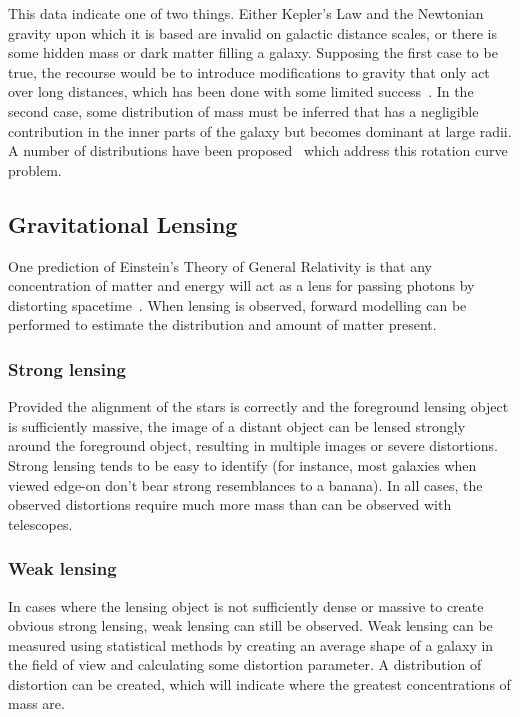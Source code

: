 This data indicate one of two things. Either Kepler's Law and the Newtonian gravity upon which it is based are invalid on galactic distance scales, or there is some hidden mass or dark matter filling a galaxy. Supposing the first case to be true, the recourse would be to introduce modifications to gravity that only act over long distances, which has been done with some limited success~\cite{Milgrom:1983,Moffat:2005si,Worsley:2014}. In the second case, some distribution of mass must be inferred that has a negligible contribution in the inner parts of the galaxy but becomes dominant at large radii. A number of distributions have been proposed~\cite{NGW:1997,Merritt:2006} which address this rotation curve problem.

\subsection{Gravitational Lensing}

One prediction of Einstein's Theory of General Relativity is that any concentration of matter and energy will act as a lens for passing photons by distorting spacetime~\cite{}. When lensing is observed, forward modelling can be performed to estimate the distribution and amount of matter present.

\subsubsection{Strong lensing}

Provided the alignment of the stars is correctly and the foreground lensing object is sufficiently massive, the image of a distant object can be lensed strongly around the foreground object, resulting in multiple images or severe distortions. Strong lensing tends to be easy to identify (for instance, most galaxies when viewed edge-on don't bear strong resemblances to a banana). In all cases, the observed distortions require much more mass than can be observed with telescopes.

\subsubsection{Weak lensing}

In cases where the lensing object is not sufficiently dense or massive to create obvious strong lensing, weak lensing can still be observed. Weak lensing can be measured using statistical methods by creating an average shape of a galaxy in the field of view and calculating some distortion parameter. A distribution of distortion can be created, which will indicate where the greatest concentrations of mass are.

